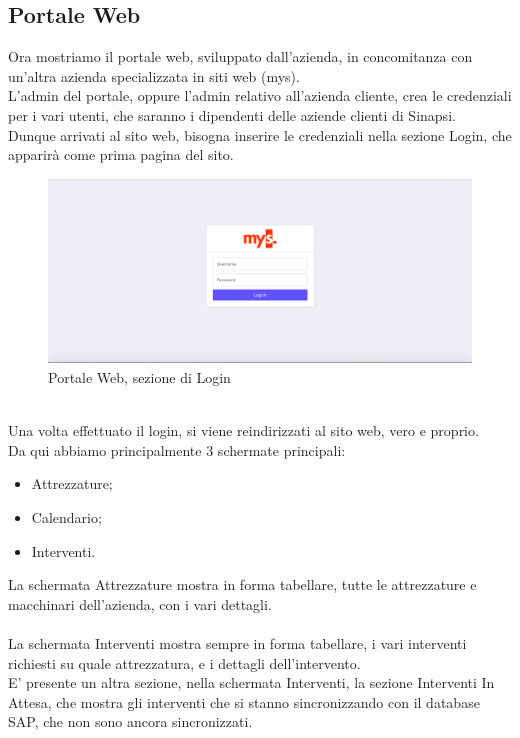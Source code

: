 \subsection{Portale Web}
Ora mostriamo il portale web, sviluppato dall'azienda, in concomitanza con un'altra azienda specializzata in siti web (mys).\\
L'admin del portale, oppure l'admin relativo all'azienda cliente, crea le credenziali per i vari utenti, che saranno i dipendenti delle aziende clienti di Sinapsi.\\
Dunque arrivati al sito web, bisogna inserire le credenziali nella sezione Login, che apparirà come prima pagina del sito.\\
\begin{figure}[!h] 
	\centering 
	\includegraphics[scale = 0.3]{immagini/portale/login.png} 
	\caption {Portale Web, sezione di Login}
\end{figure}
\\Una volta effettuato il login, si viene reindirizzati al sito web, vero e proprio.\\
Da qui abbiamo principalmente 3 schermate principali:
\begin{itemize}
	\item Attrezzature;
	\item Calendario;
	\item Interventi.\\
\end{itemize}
La schermata Attrezzature mostra in forma tabellare, tutte le attrezzature e macchinari dell'azienda, con i vari dettagli.\\\\
La schermata Interventi mostra sempre in forma tabellare, i vari interventi richiesti su quale attrezzatura, e i dettagli dell'intervento.\\
E' presente un altra sezione, nella schermata Interventi, la sezione Interventi In Attesa, che mostra gli interventi che si stanno sincronizzando con il database SAP, che non sono ancora sincronizzati.
